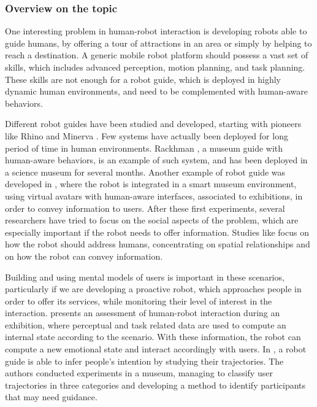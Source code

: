 \subsubsection{Overview on the topic}
One interesting problem in human-robot interaction is developing robots able to guide humans, by offering a tour of attractions in an area or simply by helping to reach a destination.
A generic mobile robot platform should possess a vast set of skills, which includes advanced perception, motion planning, and task planning. These skills are not enough for a robot guide, which is deployed in highly dynamic human environments, and need to be complemented with human-aware behaviors.

Different robot guides have been studied and developed, starting with pioneers like Rhino and Minerva \cite{thrun2000probabilistic}.  Few systems have actually been deployed for long period of time in human environments. Rackhman \cite{clodic2006rackham}, a museum guide with human-aware behaviors, is an example of such system, and has been deployed in a science museum for several months. Another example of robot guide was developed in \cite{bueno2011autonomous}, where the robot is integrated  in a smart museum environment, using virtual avatars with human-aware interfaces, associated to exhibitions, in order to convey information to users. After these first experiments, several researchers have tried to focus on the social aspects of the problem, which are especially important if the robot needs to offer information. Studies like \cite{yousuf2012development,evers2014development} focus on how the robot should address humans, concentrating on spatial relationships and on how the robot can convey information.

Building and using mental models of users is important in these scenarios, particularly if we are developing a proactive robot, which approaches people in order to offer its services, while monitoring their level of interest in the interaction. \cite{Jensen2005} presents an assessment of human-robot interaction during an exhibition, where perceptual and task related data are used to compute an internal state according to the scenario. With these information, the robot can compute a new emotional state and interact accordingly with users.
In \cite{rashed2015toward}, a robot guide is able to infer people's intention by studying their trajectories. The authors conducted experiments in a museum, managing to classify user trajectories in three categories and developing a method to identify participants that may need guidance. 

